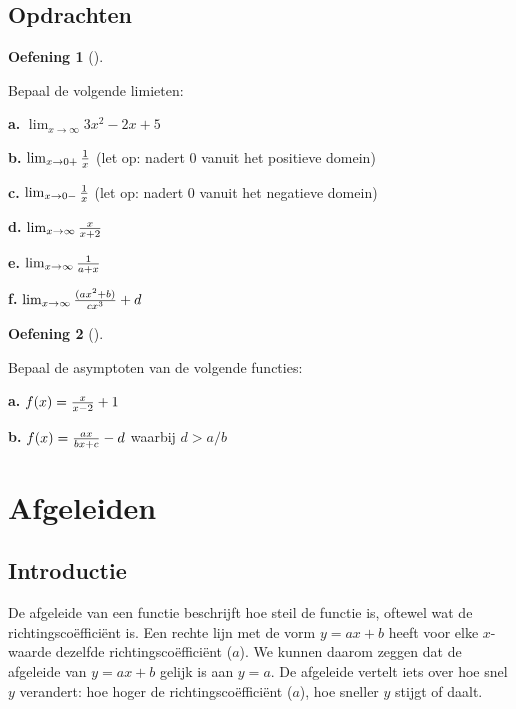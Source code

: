 \documentclass[
  a4paper,
]{scrbook}
\theoremstyle{definition}
\newtheorem{exercise}{Oefening}[chapter]
\theoremstyle{remark}
\begin{document}
\hypertarget{opdrachten-3}{%
\section{Opdrachten}\label{opdrachten-3}}

\begin{exercise}[]\protect\hypertarget{exr-asymp-1}{}\label{exr-asymp-1}

Bepaal de volgende limieten:

\textbf{a.} \(\lim_{x\to\infty}3x^2-2x+5\)

\textbf{b.} \(\lim_{ x \to 0+} {1 \over x}\) (let op: nadert 0 vanuit
het positieve domein)

\textbf{c.} \(\lim_{ x \to 0-} {1 \over x}\) (let op: nadert 0 vanuit
het negatieve domein)

\textbf{d.} \(\lim_{x \to \infty}{x \over x+2}\)

\textbf{e.} \(\lim_{x \to \infty}{1 \over a+x}\)

\textbf{f.} \(\lim_{x \to \infty}{(ax^2+b) \over cx^3}+d\)

\end{exercise}

\begin{exercise}[]\protect\hypertarget{exr-asymp-2}{}\label{exr-asymp-2}

Bepaal de asymptoten van de volgende functies:

\textbf{a.} \(f(x) = {x \over x-2} + 1\)

\textbf{b.} \(f(x) = {ax \over bx+c} - d\) waarbij \(d>a/b\)

\end{exercise}

\hypertarget{sec-afgeleiden}{%
\chapter{Afgeleiden}\label{sec-afgeleiden}}

\hypertarget{introductie-4}{%
\section{Introductie}\label{introductie-4}}

De afgeleide van een functie beschrijft hoe steil de functie is, oftewel
wat de richtingscoëfficiënt is. Een rechte lijn met de vorm \(y=ax+b\)
heeft voor elke \(x\)-waarde dezelfde richtingscoëfficiënt (\(a\)). We
kunnen daarom zeggen dat de afgeleide van \(y=ax+b\) gelijk is aan
\(y=a\). De afgeleide vertelt iets over hoe snel \(y\) verandert: hoe
hoger de richtingscoëfficiënt (\(a\)), hoe sneller \(y\) stijgt of
daalt.
\end{document}
